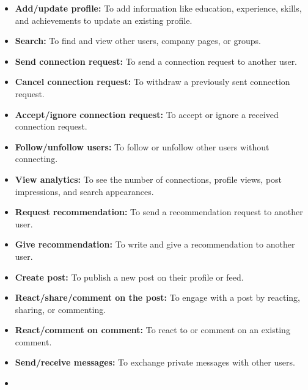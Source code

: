 \begin{itemize}
\item
\protect{}\label{7fJGjrdo2eABhuwRmZNh5}
\textbf{Add/update profile:} To add information like education, experience, skills, and achievements to update an existing profile.
\item
\protect{}\label{B5IeOCFE3s4kiJ_ZlgCN5}
\textbf{Search:} To find and view other users, company pages, or groups.
\item
\protect{}\label{xYsUVPy7kcfZbnCLrrJ7A}
\textbf{Send connection request:} To send a connection request to another user.
\item
\protect{}\label{Y1oGEK0_4quCSFx1lWwcF}
\textbf{Cancel connection request:} To withdraw a previously sent connection request.
\item
\protect{}\label{dsQZljOaDa2bIsBXLmbW_}
\textbf{Accept/ignore connection request:} To accept or ignore a received connection request.
\item
\protect{}\label{YxjlzEJhuHlwMtfgOHbCo}
\textbf{Follow/unfollow users:} To follow or unfollow other users without connecting.
\item
\protect{}\label{PwvIre67lx_ChkO-gDJwJ}
\textbf{View analytics:} To see the number of connections, profile views, post impressions, and search appearances.
\item
\protect{}\label{3VgEgEf1lUlFskVo6CrxO}
\textbf{Request recommendation:} To send a recommendation request to another user.
\item
\protect{}\label{VdfMN8cY6G1Pwa5tpKLMI}
\textbf{Give recommendation:} To write and give a recommendation to another user.
\item
\protect{}\label{HBsF2nZ4hxnPkD-umvFwx}
\textbf{Create post:} To publish a new post on their profile or feed.
\item
\protect{}\label{eD1MbN5bkQQqCHtsd7p9A}
\textbf{React/share/comment on the post:} To engage with a post by reacting, sharing, or commenting.
\item
\protect{}\label{FQTN61v6jgA_WVZ3kWlIP}
\textbf{React/comment on comment:} To react to or comment on an existing comment.
\item
\protect{}\label{ZkiH1vJVn8269rRBIhMPV}
\textbf{Send/receive messages:} To exchange private messages with other users.
\item
\protect{}\label{t7kSeetgt5bdXP8mSleov}

\end{itemize}
